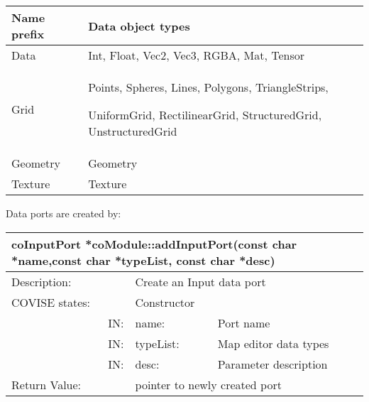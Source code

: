 \begin{longtable}{|p{4cm}|p{9.5cm}|}
\hline
{Name prefix} & {Data object types} \\
\hline\hline
Data & Int, Float, Vec2, Vec3, RGBA, Mat, Tensor \\
\hline
Grid & Points, Spheres, Lines, Polygons, TriangleStrips,
     
     UniformGrid, RectilinearGrid, StructuredGrid, UnstructuredGrid \\
\hline
Geometry & Geometry \\
\hline
Texture & Texture \\
\hline
\end{longtable}

Data ports are created by:



\begin{longtable}{|p{4cm}|p{2.5cm}|p{7cm}|}
\hline
\multicolumn{3}{|l|}{\bf coInputPort *coModule::addInputPort(const char *name,const char *typeList, const char *desc)} \\
\hline
{Description:}    & \multicolumn{2}{|p{9.5cm}|}{Create an Input data port} \\ \hline
{COVISE states:}  & \multicolumn{2}{|p{9.5cm}|}{Constructor} \\ \hline
\multicolumn{1}{|r|}{IN:}        & {name:}      &  {Port name} \\ \hline
\multicolumn{1}{|r|}{IN:}        & {typeList:}  & {Map editor data types} \\ \hline
\multicolumn{1}{|r|}{IN:}        & {desc:}      & {Parameter description} \\ \hline
{Return Value:}   &  \multicolumn{2}{|p{9.5cm}|}{pointer to newly created port} \\ \hline
\end{longtable}


